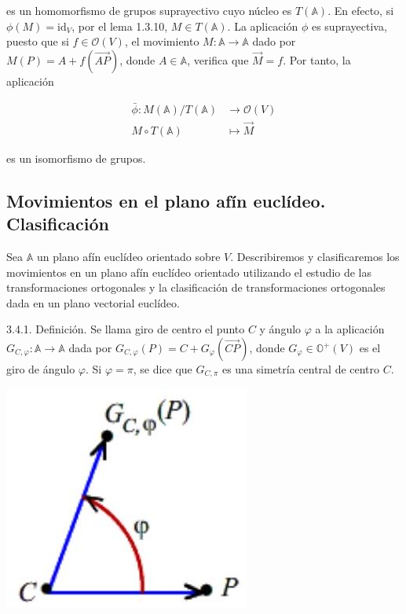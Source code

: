 \documentclass[12pt, a4paper, ones, notitlepage, openany,titlepage]{article}
\begin{document}
es un homomorfismo de grupos suprayectivo cuyo núcleo es $T(\mathbb{A})$. En efecto, si $\phi(M)=\mathrm{id}_{V}$, por el lema 1.3.10, $M \in T(\mathbb{A})$. La aplicación $\phi$ es suprayectiva, puesto que si $f \in \mathcal{O}(V)$, el movimiento $M: \mathbb{A} \rightarrow \mathbb{A}$ dado por $M(P)=A+f(\overrightarrow{A P})$, donde $A \in \mathbb{A}$, verifica que $\vec{M}=f$. Por tanto, la aplicación

$$
\begin{aligned}
	\bar{\phi}: M(\mathbb{A}) / T(\mathbb{A}) & \longrightarrow \mathcal{O}(V) \\
	M \circ T(\mathbb{A}) & \longmapsto \vec{M}
\end{aligned}
$$

es un isomorfismo de grupos.

\subsection{Movimientos en el plano afín euclídeo. Clasificación}
Sea $\mathbb{A}$ un plano afín euclídeo orientado sobre $V$. Describiremos y clasificaremos los movimientos en un plano afín euclídeo orientado utilizando el estudio de las transformaciones ortogonales y la clasificación de transformaciones ortogonales dada en un plano vectorial euclídeo.

3.4.1. Definición. Se llama giro de centro el punto $C$ y ángulo $\varphi$ a la aplicación $G_{C, \varphi}: \mathbb{A} \rightarrow \mathbb{A}$ dada por $G_{C, \varphi}(P)=C+G_{\varphi}(\overrightarrow{C P})$, donde $G_{\varphi} \in \mathbb{O}^{+}(V)$ es el giro de ángulo $\varphi$. Si $\varphi=\pi$, se dice que $G_{C, \pi}$ es una simetría central de centro $C$.

\begin{center}
	\includegraphics[max width=\textwidth]{2023_04_25_301d1803eaf1bc74cfd9g-080(1)}
\end{center}
\end{document}
